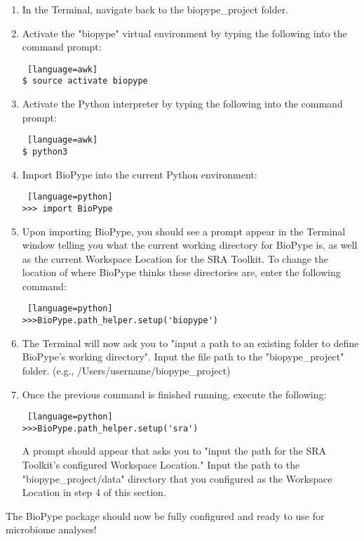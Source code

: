 \begin{enumerate}
\item In the Terminal, navigate back to the biopype\_project folder.


\item Activate the "biopype" virtual environment by typing the following into the command prompt:
\begin{lstlisting} [language=awk]
$ source activate biopype
\end{lstlisting}

\item Activate the Python interpreter by typing the following into the command prompt:
\begin{lstlisting} [language=awk]
$ python3
\end{lstlisting}

\item Import BioPype into the current Python environment:
\begin{lstlisting} [language=python]
>>> import BioPype
\end{lstlisting}


\item Upon importing BioPype, you should see a prompt appear in the Terminal window telling you what the current working directory for BioPype is, as well as the current Workspace Location for the SRA Toolkit. To change the location of where BioPype thinks these directories are, enter the following command:
\begin{lstlisting} [language=python]
>>>BioPype.path_helper.setup('biopype')
\end{lstlisting}

\item The Terminal will now ask you to "input a path to an existing folder to define BioPype's working directory". Input the file path to the "biopype\_project" folder. (e.g., /Users/username/biopype\_project)

\item Once the previous command is finished running, execute the following:
\begin{lstlisting} [language=python]
>>>BioPype.path_helper.setup('sra')
\end{lstlisting}
A prompt should appear that asks you to "input the path for the SRA Toolkit's configured Workspace Location." Input the path to the "biopype\_project/data" directory that you configured as the Workspace Location in step 4 of this section.


\end{enumerate}
%

The BioPype package should now be fully configured and ready to use for microbiome analyses!

%


